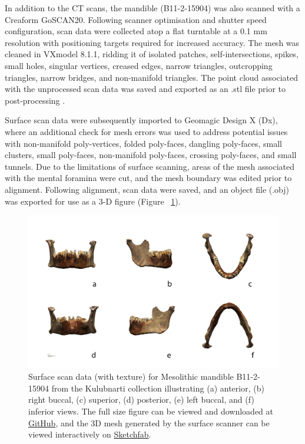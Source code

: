 \documentclass[review]{elsarticle}
\begin{document}
In addition to the CT scans, the mandible (B11-2-15904) was also scanned with a Creaform GoSCAN20. Following scanner optimisation and shutter speed configuration, scan data were collected atop a flat turntable at a 0.1 mm resolution with positioning targets required for increased accuracy. The mesh was cleaned in VXmodel 8.1.1, ridding it of isolated patches, self-intersections, spikes, small holes, singular vertices, creased edges, narrow triangles, outcropping triangles, narrow bridges, and non-manifold triangles. The point cloud associated with the unprocessed scan data was saved and exported as an .stl file prior to post-processing \citep{RN5585}.

Surface scan data \citep{RN5931,RN5924} were subsequently imported to Geomagic Design X (Dx), where an additional check for mesh errors was used to address potential issues with non-manifold poly-vertices, folded poly-faces, dangling poly-faces, small clusters, small poly-faces, non-manifold poly-faces, crossing poly-faces, and small tunnels. Due to the limitations of surface scanning, areas of the mesh associated with the mental foramina were cut, and the mesh boundary was edited prior to alignment. Following alignment, scan data were saved, and an object file (.obj) was exported for use as a 3-D figure (Figure ~\ref{fig:Fig2}).

\begin{figure}[ht]\centering
\includegraphics[width=\linewidth]{Fig1}
\caption{Surface scan data (with texture) for Mesolithic mandible B11-2-15904 from the Kulubnarti collection illustrating (a) anterior, (b) right buccal, (c) superior, (d) posterior, (e) left buccal, and (f) inferior views. The full size figure can be viewed and downloaded at \href{https://github.com/aksel-blaise/cai.mandible/blob/main/figures/Fig1.png}{GitHub}, and the 3D mesh generated by the surface scanner can be viewed interactively on \href{https://skfb.ly/on9Zs}{Sketchfab}.}
\label{fig:Fig2}
\end{figure}
\end{document}

